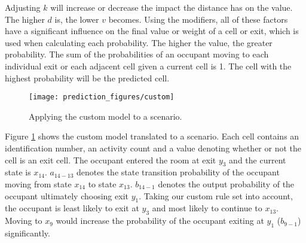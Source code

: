 Adjusting \(k\) will increase or decrease the impact the distance has on the value. The higher \(d\) is, the lower \(v\) becomes. Using the modifiers, all of these factors have a significant influence on the final value or weight of a cell or exit, which is used when calculating each probability. The higher the value, the greater probability. The sum of the probabilities of an occupant moving to each individual exit or each adjacent cell given a current cell is 1. The cell with the highest probability will be the predicted cell.
\begin{figure}[htb]
\centering
\texttt{[image: prediction\_figures/custom]}
\caption{Applying the custom model to a scenario.}
\label{fig:custom_model}
\end{figure}

Figure \ref{fig:custom_model} shows the custom model translated to a scenario. Each cell contains an identification number, an activity count and a value denoting whether or not the cell is an exit cell. The occupant entered the room at exit \(y_3\) and the current state is \(x_{14}\). \(a_{14-13}\) denotes the state transition probability of the occupant moving from state \(x_{14}\) to state \(x_{13}\). \(b_{14-1}\) denotes the output probability of the occupant ultimately choosing exit \(y_{1}\). Taking our custom rule set into account, the occupant is least likely to exit at \(y_3\) and most likely to continue to \(x_{13}\). Moving to \(x_9\) would increase the probability of the occupant exiting at \(y_{1}\) (\(b_{9-1}\)) significantly.